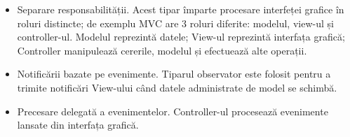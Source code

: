 \documentclass[12pt, a4paper, oneside, romanian]{teza-upb}
\begin{document}
\begin{itemize}
	\item Separare responsabilității. Acest tipar împarte procesare interfeței grafice în roluri distincte; de exemplu MVC are 3 roluri diferite: modelul, view-ul și controller-ul. Modelul reprezintă datele; View-ul reprezintă interfața grafică; Controller manipulează cererile, modelul și efectuează alte operații.
	\item Notificării bazate pe evenimente. Tiparul observator este folosit pentru a trimite notificări View-ului când datele administrate de model se schimbă.
	\item Precesare delegată a evenimentelor. Controller-ul procesează evenimente lansate din interfața grafică.
\end{itemize}
\end{document}
